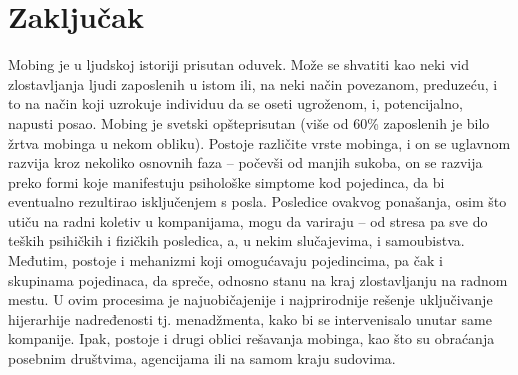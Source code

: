 \documentclass[a4paper]{article}
\begin{document}
    \section{Zaključak}
    Mobing je u ljudskoj istoriji prisutan oduvek. Može se shvatiti kao neki vid zlostavljanja ljudi zaposlenih u istom ili, na neki način povezanom, preduzeću, i to na način koji uzrokuje individuu da se oseti ugroženom, i, potencijalno, napusti posao. Mobing je svetski opšteprisutan (više od 60\% zaposlenih je bilo žrtva mobinga u nekom obliku). Postoje različite vrste mobinga, i on se uglavnom razvija kroz nekoliko osnovnih faza -- počevši od manjih sukoba, on se razvija preko formi koje manifestuju psihološke simptome kod pojedinca, da bi eventualno rezultirao isključenjem s posla. Posledice ovakvog ponašanja, osim što utiču na radni koletiv u kompanijama, mogu da variraju -- od stresa pa sve do teških psihičkih i fizičkih posledica, a, u nekim slučajevima, i samoubistva.
    Međutim, postoje i mehanizmi koji omogućavaju pojedincima, pa čak i skupinama pojedinaca, da spreče, odnosno stanu na kraj zlostavljanju na radnom mestu. U ovim procesima je najuobičajenije i najprirodnije rešenje uključivanje hijerarhije nadređenosti tj. menadžmenta, kako bi se intervenisalo unutar same kompanije. Ipak, postoje i drugi oblici rešavanja mobinga, kao što su obraćanja posebnim društvima, agencijama ili na samom kraju sudovima.
    
    \printnoidxglossary[type=\acronymtype,title=Skraćenice]
    
    \appendix
    
    
\end{document}
